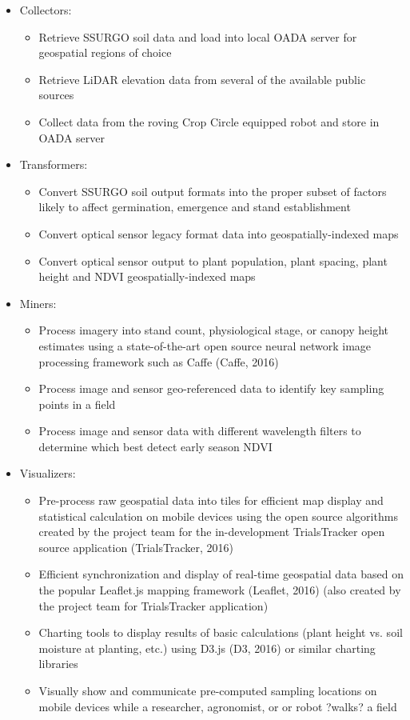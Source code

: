 \documentclass[11pt]{article}
\begin{document}
\begin{itemize}
\item Collectors: 
	\begin{itemize}
	\item Retrieve SSURGO soil data and load into local OADA server for geospatial regions of choice
	\item Retrieve LiDAR elevation data from several of the available public sources
	\item Collect data from the roving Crop Circle equipped robot and store in OADA server
	\end{itemize}
\item Transformers: 
	\begin{itemize}
	\item Convert SSURGO soil output formats into the proper subset of factors likely to affect 
		germination, emergence and stand establishment
	\item Convert optical sensor legacy format data into geospatially-indexed maps
	\item Convert optical sensor output to plant population, plant spacing, plant height and NDVI geospatially-indexed maps
	\end{itemize}
\item Miners:
	\begin{itemize}
	\item Process imagery into stand count, physiological stage, or canopy height estimates using a 
		state-of-the-art open source neural network image processing framework such as Caffe (Caffe, 2016)
	\item Process image and sensor geo-referenced data to identify key sampling points in a field
	\item Process image and sensor data with different wavelength filters to determine which best detect early season NDVI
	\end{itemize}
\item Visualizers:
	\begin{itemize}
	\item Pre-process raw geospatial data into tiles for efficient map display and statistical calculation 
		on mobile devices using the open source algorithms created by the project team for the in-development 
		TrialsTracker open source application (TrialsTracker, 2016)
	\item Efficient synchronization and display of real-time geospatial data based on the popular 
		Leaflet.js mapping framework (Leaflet, 2016) (also created by the project team for TrialsTracker application)
	\item Charting tools to display results of basic calculations (plant height vs. soil moisture at planting, etc.) 
		using D3.js (D3, 2016) or similar charting libraries
	\item Visually show and communicate pre-computed sampling locations on mobile devices while a 
		researcher, agronomist, or or robot ?walks? a field
	\end{itemize}
\end{itemize}
\end{document}

